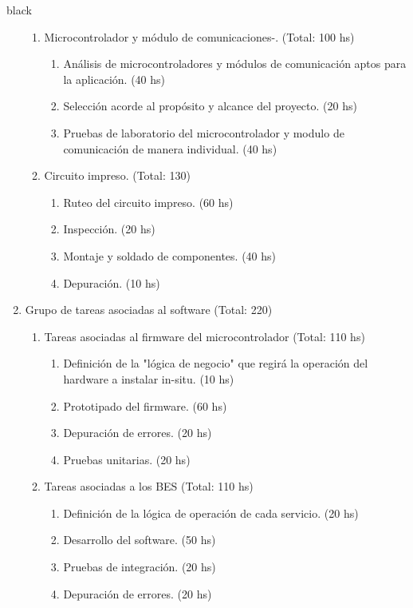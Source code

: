 \documentclass[11pt]{charter}
\begin{document}
\begin{consigna}{black}
\begin{enumerate}
\begin{enumerate}
			 \item Microcontrolador y módulo de comunicaciones-. (Total: 100 hs)
			 \begin{enumerate}
			 	\item Análisis de microcontroladores y módulos de comunicación aptos para la aplicación. (40 hs)
			 	\item Selección acorde al propósito y alcance del proyecto. (20 hs)
			 	\item Pruebas de laboratorio del microcontrolador y modulo de comunicación de manera individual. (40 hs)
			 \end{enumerate}
			 \item Circuito impreso. (Total: 130)
			 \begin{enumerate}
			 	\item Ruteo del circuito impreso. (60 hs)
			 	\item Inspección. (20 hs)
			 	\item Montaje y soldado de componentes. (40 hs)
			 	\item Depuración. (10 hs)
			 \end{enumerate}			 			 			 
		\end{enumerate}
				
	\item Grupo de tareas asociadas al software (Total: 220)
	\begin{enumerate}
		\item Tareas asociadas al firmware del microcontrolador (Total: 110 hs)
			\begin{enumerate}
				\item Definición de la "lógica de negocio" que regirá la operación del hardware a instalar in-situ. (10 hs)
				\item Prototipado del firmware. (60 hs)
				\item Depuración de errores. (20 hs)
				\item Pruebas unitarias. (20 hs)
			\end{enumerate}
		
		 \item Tareas asociadas a los BES (Total: 110 hs)
			\begin{enumerate}
				\item Definición de la lógica de operación de cada servicio. (20 hs)
				\item Desarrollo del software. (50 hs)
				\item Pruebas de integración. (20 hs)
				\item Depuración de errores. (20 hs)
			\end{enumerate}				
		

\end{enumerate}
\end{enumerate}
\end{consigna}
\end{document}
